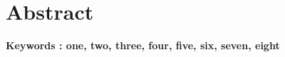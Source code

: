 \chapter*{Abstract}

\lipsum[1-3]

\hspace{1cm}
\textbf{ Keywords : one, two, three, four, five, six, seven, eight}
